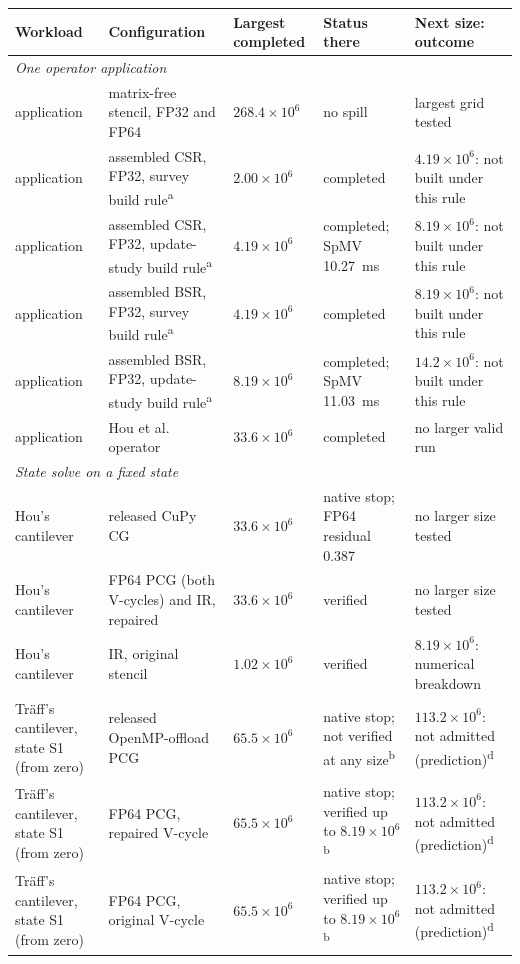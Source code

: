\begin{tabular}{lllll}
\toprule
Workload & Configuration & Largest completed & Status there & Next size: outcome \\
\midrule
\multicolumn{5}{l}{\emph{One operator application}} \\
application & matrix-free stencil, FP32 and FP64 & $268.4\times10^{6}$ & no spill & largest grid tested \\
application & assembled CSR, FP32, survey build rule\textsuperscript{a} & $2.00\times10^{6}$ & completed & $4.19\times10^{6}$: not built under this rule \\
application & assembled CSR, FP32, update-study build rule\textsuperscript{a} & $4.19\times10^{6}$ & completed; SpMV 10.27~ms & $8.19\times10^{6}$: not built under this rule \\
application & assembled BSR, FP32, survey build rule\textsuperscript{a} & $4.19\times10^{6}$ & completed & $8.19\times10^{6}$: not built under this rule \\
application & assembled BSR, FP32, update-study build rule\textsuperscript{a} & $8.19\times10^{6}$ & completed; SpMV 11.03~ms & $14.2\times10^{6}$: not built under this rule \\
application & Hou et al. operator & $33.6\times10^{6}$ & completed & no larger valid run \\
\midrule
\multicolumn{5}{l}{\emph{State solve on a fixed state}} \\
Hou's cantilever & released CuPy CG & $33.6\times10^{6}$ & native stop; FP64 residual 0.387 & no larger size tested \\
Hou's cantilever & FP64 PCG (both V-cycles) and IR, repaired & $33.6\times10^{6}$ & verified & no larger size tested \\
Hou's cantilever & IR, original stencil & $1.02\times10^{6}$ & verified & $8.19\times10^{6}$: numerical breakdown \\
Tr\"aff's cantilever, state S1 (from zero) & released OpenMP-offload PCG & $65.5\times10^{6}$ & native stop; not verified at any size\textsuperscript{b} & $113.2\times10^{6}$: not admitted (prediction)\textsuperscript{d} \\
Tr\"aff's cantilever, state S1 (from zero) & FP64 PCG, repaired V-cycle & $65.5\times10^{6}$ & native stop; verified up to $8.19\times10^{6}$\textsuperscript{b} & $113.2\times10^{6}$: not admitted (prediction)\textsuperscript{d} \\
Tr\"aff's cantilever, state S1 (from zero) & FP64 PCG, original V-cycle & $65.5\times10^{6}$ & native stop; verified up to $8.19\times10^{6}$\textsuperscript{b} & $113.2\times10^{6}$: not admitted (prediction)\textsuperscript{d} \\

\end{tabular}
